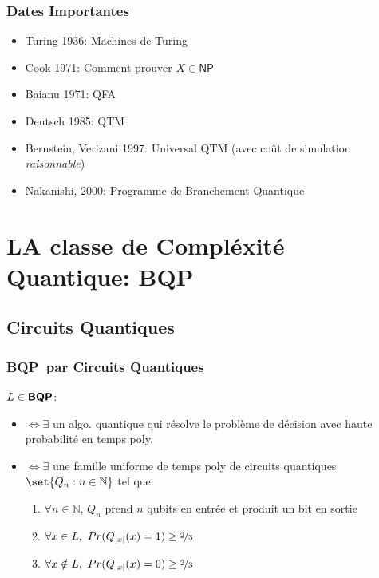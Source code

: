 \documentclass{beamer}
\newcommand{\bqp}{\textsf{\textbf{BQP}}}
\begin{document}
\begin{frame}
  \frametitle{Dates Importantes}

  \begin{itemize}
    \item Turing 1936: Machines de Turing
    \item Cook 1971: Comment prouver $X \in \textsf{NP}$
    \item Baianu 1971: QFA
    \item Deutsch 1985: QTM
    \item Bernstein, Verizani 1997: Universal QTM (avec co\^ut de simulation \emph{raisonnable})
    \item Nakanishi, 2000: Programme de Branchement Quantique
  \end{itemize}
\end{frame}


\section{\textbf{LA} classe de Compl\'exit\'e Quantique: \bqp}

\subsection{Circuits Quantiques}

\begin{frame}
  \frametitle{\bqp \ par Circuits Quantiques}

  $L \in \bqp$:
  \begin{itemize}
    \item $\iff \exists$ un algo. quantique qui r\'esolve le probl\`eme de d\'ecision avec haute probabilit\'e en temps poly.
    \item $\iff \exists$ une famille uniforme de temps poly de circuits quantiques $\set{Q_n:n\in \mathbb{N}}$ tel que:
          \begin{enumerate}
            \item $\forall n \in \mathbb{N}$, $Q_n$ prend $n$ qubits en entr\'ee et produit un bit en sortie
            \item $\forall x \in L,\ Pr(Q_{|x|}(x) = 1) \geq \nicefrac{2}{3}$
            \item $\forall x \notin L,\ Pr(Q_{|x|}(x) = 0) \geq \nicefrac{2}{3}$
          \end{enumerate}
  \end{itemize}
\end{frame}
\end{document}
